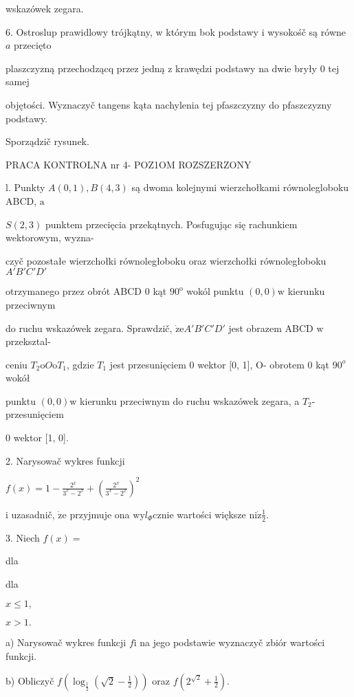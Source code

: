 \documentclass[a4paper,12pt]{article}
\begin{document}
wskazówek zegara.

6. Ostroslup prawidlowy trójkątny, $\mathrm{w}$ którym bok podstawy $\mathrm{i}$ wysokośč są równe $a$ przecięto

plaszczyzną przechodzącq przez jedną $\mathrm{z}$ krawędzi podstawy na dwie bryły $0$ tej samej

objętości. Wyznaczyč tangens kąta nachylenia tej pfaszczyzny do pfaszczyzny podstawy.

Sporządzič rysunek.




PRACA KONTROLNA nr 4- POZ1OM ROZSZERZONY

l. Punkty $A(0,1), B(4,3)$ są dwoma kolejnymi wierzchołkami równolegloboku ABCD, $\mathrm{a}$

$S(2,3)$ punktem przecięcia przekątnych. Posfugując się rachunkiem wektorowym, wyzna-

czyč pozostałe wierzchołki równoległoboku oraz wierzchołki równoległoboku $A'B'C'D'$

otrzymanego przez obrót ABCD $0$ kąt $90^{\mathrm{o}}$ wokól punktu $(0,0)\mathrm{w}$ kierunku przeciwnym

do ruchu wskazówek zegara. Sprawdzič, $\dot{\mathrm{z}}\mathrm{e}A'B'C'D'$ jest obrazem ABCD $\mathrm{w}$ przeksztal-

ceniu $T_{2}\mathrm{o}O\mathrm{o}T_{1}$, gdzie $T_{1}$ jest przesunięciem $0$ wektor $[0$, 1$]$, O- obrotem $0$ kąt $90^{o}$ wokół

punktu $(0,0)\mathrm{w}$ kierunku przeciwnym do ruchu wskazówek zegara, a $T_{2}$- przesunięciem

$0$ wektor [1, 0].

2. Narysowač wykres funkcji

$f(x)=1-\displaystyle \frac{2^{x}}{3^{x}-2^{x}}+(\frac{2^{x}}{3^{x}-2^{x}})^{2}$

$\mathrm{i}$ uzasadnič, $\dot{\mathrm{z}}\mathrm{e}$ przyjmuje ona $\mathrm{w}\mathrm{y}l_{\Phi}$cznie wartości większe $\displaystyle \mathrm{n}\mathrm{i}\dot{\mathrm{z}}\frac{1}{2}.$

3. Niech $f(x)=$

dla

dla

$x\leq 1,$

$x>1.$

a) Narysowač wykres funkcji $f\mathrm{i}$ na jego podstawie wyznaczyč zbiór wartości funkcji.

b) Obliczyč $f(\displaystyle \log_{\frac{1}{2}}(\sqrt{2}-\frac{1}{2}))$ oraz $f(2^{\sqrt{2}}+\displaystyle \frac{1}{2}).$
\end{document}
